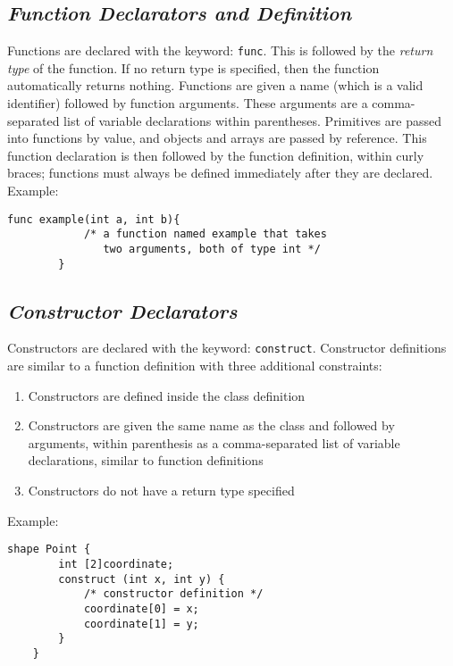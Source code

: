 \documentclass[letterpaper,12pt]{article}
\begin{document}
    \subsection{\textit{Function Declarators and Definition}}
    Functions are declared with the keyword: \texttt{func}. This is followed by the \textit{return type} of the function. If no return type is specified, then the function automatically returns nothing. Functions are given a name (which is a valid identifier) followed by function arguments. These arguments are a comma-separated list of variable declarations within parentheses. Primitives are passed into functions by value, and objects and arrays are passed by reference. This function declaration is then followed by the function definition, within curly braces; functions must always be defined immediately after they are declared.\\
    Example:\\
    \begin{lstlisting}[style=sol]
        func example(int a, int b){
            /* a function named example that takes
               two arguments, both of type int */
        }
    \end{lstlisting}

    \subsection{\textit{Constructor Declarators}}
    Constructors are declared with the keyword: \texttt{construct}. Constructor definitions are similar to a function definition with three additional constraints: 
    \begin{enumerate}
        \itemsep0em
        \item Constructors are defined inside the class definition
        \item Constructors are given the same name as the class and followed by arguments, within parenthesis as a comma-separated list of variable declarations, similar to function definitions
        \item Constructors do not have a return type specified
    \end{enumerate}
    Example:\\
    \begin{lstlisting}[style=sol]
    shape Point {
        int [2]coordinate;
        construct (int x, int y) {
            /* constructor definition */
            coordinate[0] = x;
            coordinate[1] = y;
        }
    }
    \end{lstlisting}
\end{document}
